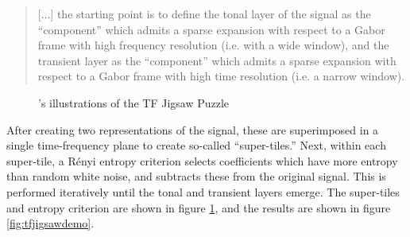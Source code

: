 \documentclass[letter,12pt]{article}
\begin{document}
\begin{quote}
	[...] the starting point is to define the tonal layer of the signal as the ``component'' which admits a sparse expansion with respect to a Gabor frame with high frequency resolution (i.e. with a wide window), and the transient layer as the ``component'' which admits a sparse expansion with respect to a Gabor frame with high time resolution (i.e. a narrow window).
\end{quote}

\begin{figure}[ht]
	\centering
	\hspace{1em}
	\caption{\citet{tfjigsaw}'s illustrations of the TF Jigsaw Puzzle}
	\label{fig:supertiles}
\end{figure}

After creating two representations of the signal, these are superimposed in a single time-frequency plane to create so-called ``super-tiles.'' Next, within each super-tile, a R{\'e}nyi entropy criterion selects coefficients which have more entropy than random white noise, and subtracts these from the original signal. This is performed iteratively until the tonal and transient layers emerge. The super-tiles and entropy criterion are shown in figure \ref{fig:supertiles}, and the results are shown in figure \ref{fig:tfjigsawdemo}.
\end{document}
